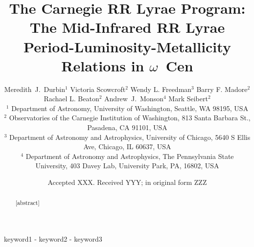 \documentclass[a4paper,fleqn,usenatbib]{mnras}
\title[Mid-IR RRL PLZ Relations in $\omega$ Cen]{The Carnegie RR Lyrae Program: The Mid-Infrared RR Lyrae Period-Luminosity-Metallicity Relations in $\omega$~Cen}
\author[M.~J.~Durbin et al.]{Meredith~J.~Durbin$^{1}$
Victoria Scowcroft$^{2}$
Wendy L. Freedman$^{3}$
Barry F. Madore$^{2}$
\newauthor Rachael L. Beaton$^{2}$
Andrew~J.~Monson$^{4}$
Mark Seibert$^{2}$
\\
$^1$ Department of Astronomy, University of Washington, Seattle, WA 98195, USA \\
$^2$ Observatories of the Carnegie Institution of Washington, 813 Santa Barbara St., Pasadena, CA 91101, USA \\
$^3$ Department of Astronomy and Astrophysics, University of Chicago, 5640 S Ellis Ave, Chicago, IL 60637, USA \\
$^{4}$ Department of Astronomy and Astrophysics, The Pennsylvania State University, 403 Davey Lab, University Park, PA, 16802, USA \\
}
\date{Accepted XXX. Received YYY; in original form ZZZ}
\begin{document}
\label{firstpage}
\pagerange{\pageref{firstpage}-\pageref{lastpage}}
\maketitle

\begin{abstract}
[abstract]
\end{abstract}

\begin{keywords}
keyword1 - keyword2 - keyword3
\end{keywords}







\end{document}
